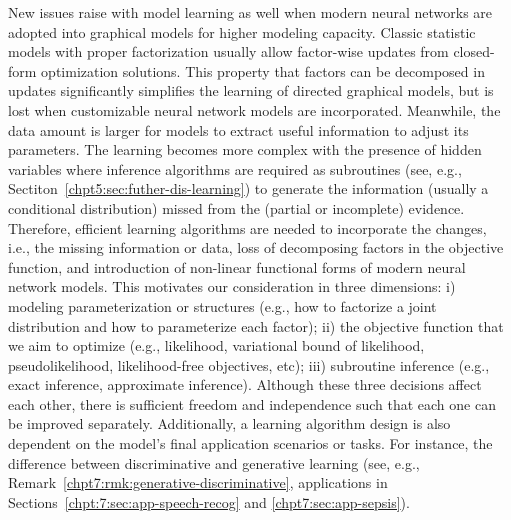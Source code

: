 New issues raise with model learning as well when modern neural networks are adopted into graphical models for higher modeling capacity. Classic statistic models with proper factorization usually allow factor-wise updates from closed-form optimization solutions. This property that factors can be decomposed in updates significantly simplifies the learning of directed graphical models, but is lost when customizable neural network models are incorporated. Meanwhile, the data amount is larger for models to extract useful information to adjust its parameters. The learning becomes more complex with the presence of hidden variables where inference algorithms are required as subroutines (see, e.g., Sectiton~\ref{chpt5:sec:futher-dis-learning}) to generate the information (usually a conditional distribution) missed from the (partial or incomplete) evidence.
Therefore, efficient learning algorithms are needed to incorporate the changes, i.e., the missing information or data, loss of decomposing factors in the objective function, and introduction of non-linear functional forms of modern neural network models. This motivates our consideration in three dimensions: i) modeling parameterization or structures (e.g., how to factorize a joint distribution and how to parameterize each factor); ii) the objective function that we aim to optimize (e.g., likelihood, variational bound of likelihood, pseudolikelihood, likelihood-free objectives, etc); iii) subroutine inference (e.g., exact inference, approximate inference). Although these three decisions affect each other, there is sufficient freedom and independence such that each one can be improved separately. Additionally, a learning algorithm design is also dependent on the model's final application scenarios or tasks. For instance, the difference between discriminative and generative learning (see, e.g., Remark~\ref{chpt7:rmk:generative-discriminative}, applications in Sections~\ref{chpt:7:sec:app-speech-recog} and \ref{chpt7:sec:app-sepsis}).


